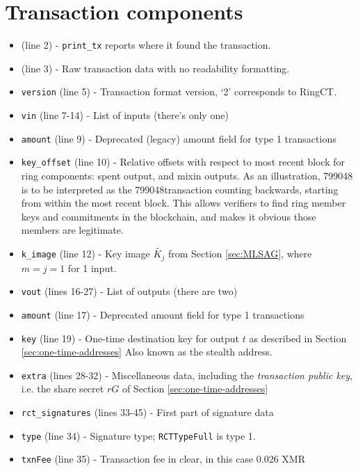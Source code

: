 \begin{appendices}
\begin{Verbatim}[commandchars=\\\{\}, numbers=left]
\end{Verbatim}

\section*{Transaction components}
	
\begin{itemize}
    \item (line 2) - {\tt print\_tx} reports where it found the transaction.
    \item (line 3) - Raw transaction data with no readability formatting.
	\item {\tt version} (line 5) - Transaction format version, `2' corresponds to RingCT.
	\item {\tt vin} (line 7-14) - List of inputs (there’s only one)
	\item {\tt amount} (line 9) - Deprecated (legacy) amount field for type 1 transactions
	\item {\tt key\_offset} (line 10) - Relative offsets with respect to most recent block for ring components: spent output, and mixin outputs. As an illustration, 799048 is to be interpreted as the 799048\nth transaction counting backwards, starting from within the most recent block. This allows verifiers to find ring member keys and commitments in the blockchain, and makes it obvious those members are legitimate.
	\item {\tt k\_image} (line 12) - Key image \(\tilde{K_j}\) from Section \ref{sec:MLSAG}, where $m = j = 1$ for 1 input.
	\item {\tt vout} (lines 16-27) - List of outputs (there are two)
	\item {\tt amount} (line 17) - Deprecated amount field for type 1 transactions
	\item {\tt key} (line 19) - One-time destination key for output $t$ as described in Section \ref{sec:one-time-addresses} Also known as the stealth address.
	\item {\tt extra} (lines 28-32) - Miscellaneous data, including the {\em transaction public key}, i.e. the share secret $r G$ of Section  \ref{sec:one-time-addresses} %
	\item {\tt rct\_signatures} (lines 33-45) - First part of signature data
	\item {\tt type} (line 34) - Signature type; {\tt RCTTypeFull} is type 1.
	\item {\tt txnFee} (line 35) - Transaction fee in clear, in this case 0.026 XMR

\end{itemize}
\end{appendices}
